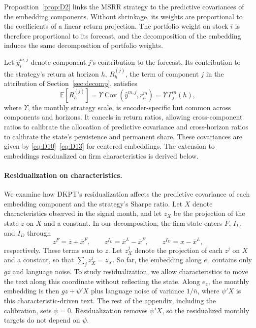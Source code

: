 \documentclass[11pt,letterpaper]{article}
\theoremstyle{remark}
\DeclareMathOperator{\Cov}{Cov}
\begin{document}
Proposition~\ref{prop:D2} links the MSRR strategy to the predictive covariances of the embedding components. Without shrinkage, its weights are proportional to the coefficients of a linear return projection. The portfolio weight on stock $i$ is therefore proportional to its forecast, and the decomposition of the embedding induces the same decomposition of portfolio weights.

Let $\hat y_i^{m,j}$ denote component $j$'s contribution to the forecast. Its contribution to the strategy's return at horizon $h$, $R_h^{(j)}$, the term of component $j$ in the attribution of Section~\ref{sec:decomp}, satisfies
\begin{equation}\label{eq:D17}
\mathbb E[R_h^{(j)}]
=\Upsilon\Cov(\hat y^{m,j},r_h^m)
=\Upsilon\,\Gamma_j^m(h),
\end{equation}
where $\Upsilon$, the monthly strategy scale, is encoder-specific but common across components and horizons. It cancels in return ratios, allowing cross-component ratios to calibrate the allocation of predictive covariance and cross-horizon ratios to calibrate the state's persistence and permanent share. These covariances are given by \eqref{eq:D10}--\eqref{eq:D13} for centered embeddings. The extension to embeddings residualized on firm characteristics is derived below.

\paragraph{Residualization on characteristics.}
We examine how DKPT's residualization affects the predictive covariance of each embedding component and the strategy's Sharpe ratio. Let $X$ denote characteristics observed in the signal month, and let $z_X$ be the projection of the state $z$ on $X$ and a constant. In our decomposition, the firm state enters $F$, $I_L$, and $I_D$ through
\[
z^F=\bar z+\bar x^F,\qquad
z^{I_L}=\bar x^L-\bar x^F,\qquad
z^{I_D}=x-\bar x^L,
\]
respectively. These terms sum to $z$. Let $z_X^j$ denote the projection of each $z^j$ on $X$ and a constant, so that $\sum_j z_X^j=z_X$. So far, the embedding along $e_z$ contains only $gz$ and language noise. To study residualization, we allow characteristics to move the text along this coordinate without reflecting the state. Along $e_z$, the monthly embedding is then $gz+\psi'X$ plus language noise of variance $1/\bar n$, where $\psi'X$ is this characteristic-driven text. The rest of the appendix, including the calibration, sets $\psi=0$. Residualization removes $\psi'X$, so the residualized monthly targets do not depend on $\psi$.
\end{document}

